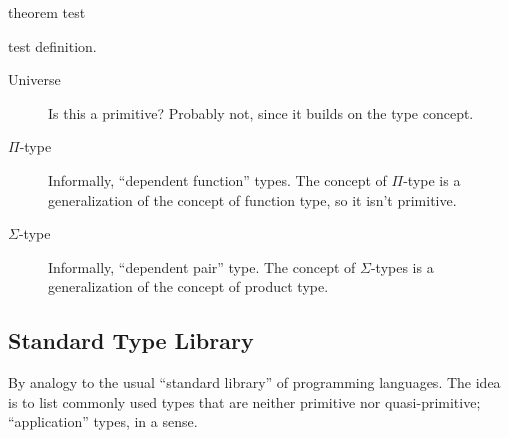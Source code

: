 \begin{theorem}
  theorem test
\end{theorem}

\begin{definition}
  test definition.
\end{definition}

\begin{description}

\item [Universe]  Is this a primitive?  Probably not, since it builds on the type concept.

\item [\(\Pi\)-type] Informally, ``dependent function''
  types.  The concept of \(\Pi\)-type is a generalization of the
  concept of function type, so it isn't primitive.

\item [\(\Sigma\)-type] Informally, ``dependent pair''
  type.
  The concept of \(\Sigma\)-types is a generalization of the concept
  of product type.

\end{description}

\subsection{Standard Type Library}
\label{subs:hottstdlib}

\begin{ednote}
  By analogy to the usual ``standard library'' of programming
  languages.  The idea is to list commonly used types that are neither
  primitive nor quasi-primitive; ``application'' types, in a sense.
\end{ednote}


